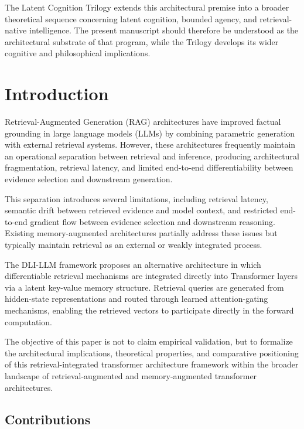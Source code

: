 \documentclass[
]{article}
\begin{document}
The Latent Cognition Trilogy extends this architectural premise into a broader theoretical sequence concerning latent cognition, bounded agency, and retrieval-native intelligence. The present manuscript should therefore be understood as the architectural substrate of that program, while the Trilogy develops its wider cognitive and philosophical implications.

\hypertarget{introduction}{%
\section{Introduction}\label{introduction}}

Retrieval-Augmented Generation (RAG) architectures have improved factual
grounding in large language models (LLMs) by combining parametric
generation with external retrieval systems. However, these architectures
frequently maintain an operational separation between retrieval and
inference, producing architectural fragmentation, retrieval latency, and
limited end-to-end differentiability between evidence selection and
downstream generation.

This separation introduces several limitations, including retrieval
latency, semantic drift between retrieved evidence and model context,
and restricted end-to-end gradient flow between evidence selection and
downstream reasoning. Existing memory-augmented architectures partially
address these issues but typically maintain retrieval as an external or
weakly integrated process.

The DLI-LLM framework proposes an alternative architecture in which
differentiable retrieval mechanisms are integrated directly into
Transformer layers via a latent key-value memory structure. Retrieval
queries are generated from hidden-state representations and routed
through learned attention-gating mechanisms, enabling the retrieved
vectors to participate directly in the forward computation.

The objective of this paper is not to claim empirical validation, but to
formalize the architectural implications, theoretical properties, and
comparative positioning of this retrieval-integrated transformer
architecture framework within the broader landscape of
retrieval-augmented and memory-augmented transformer architectures.

\hypertarget{contributions}{%
\subsection{Contributions}\label{contributions}}
\end{document}
